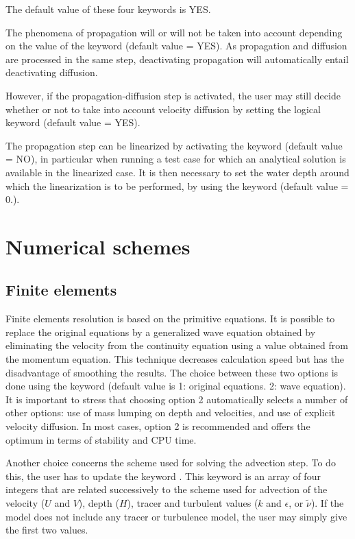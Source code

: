 The default value of these four keywords is YES.

The phenomena of propagation will or will not be taken into account depending
on the value of the keyword  (default value = YES).
As propagation and diffusion are processed in the same step,
deactivating propagation will automatically entail deactivating diffusion.

However, if the propagation-diffusion step is activated, the user may still
decide whether or not to take into account velocity diffusion by setting
the logical keyword  (default value = YES).

The propagation step can be linearized by activating the keyword
 (default value = NO), in particular when running
a test case for which an analytical solution is available in the linearized case.
It is then necessary to set the water depth around which the
linearization is to be performed, by using the keyword
 (default value = 0.).


\section{Numerical schemes}

\subsection{Finite elements}
Finite elements resolution is based on the primitive equations.
It is possible to replace the original equations by a generalized wave equation
obtained by eliminating the velocity from the continuity equation using a value
obtained from the momentum equation.
This technique decreases calculation speed but has the disadvantage
of smoothing the results.
The choice between these two options is done using the keyword
(default value is 1: original equations. 2: wave equation).
It is important to stress that choosing option 2 automatically selects
a number of other options:
use of mass lumping on depth and velocities, and use of explicit velocity
diffusion.
In most cases, option 2 is recommended and offers the optimum in terms of
stability and CPU time.

Another choice concerns the scheme used for solving the advection step.
To do this, the user has to update the keyword .
This keyword is an array of four integers that are related successively
to the scheme used for advection of the velocity ($U$ and $V$), depth ($H$),
tracer and turbulent values ($k$ and $\epsilon$, or $\tilde{\nu}$).
If the model does not include any tracer or turbulence model,
the user may simply give the first two values.

